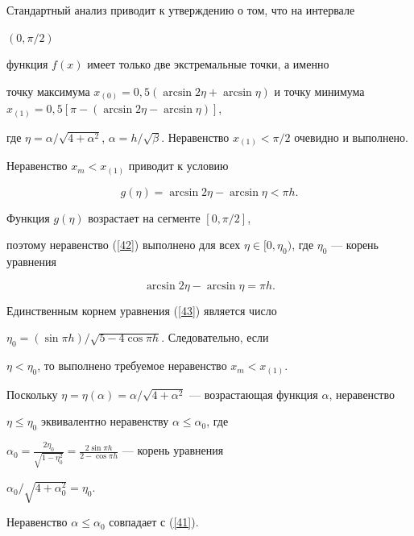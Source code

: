 \begin{pf}


Стандартный анализ приводит к утверждению о том, что на интервале 


$({0,\pi/2})$


функция $f(x)$ имеет только две экстремальные точки, а именно


точку максимума $ x_{(0)}=0{,}5({\arcsin 2\eta+\arcsin


\eta}) $ и точку минимума $ x_{(1)}=0{,}5[ {\pi -


({\arcsin 2\eta-\arcsin \eta})}]$,


где $\eta=\alpha /\sqrt {4+\alpha ^2}$, $ \alpha=h/\sqrt


{\beta}$. Неравенство $x_{(1)} < \pi /2$ очевидно и выполнено.


Неравенство $x_m < x_{(1)} $ приводит к условию


\begin{equation}\label{42}


g(\eta)=\arcsin 2\eta-\arcsin \eta < \pi h.


\end{equation}


Функция $g(\eta) $ возрастает на сегменте $[ {0,\pi /2}]$, 


поэтому неравенство (\ref{42}) выполнено для всех $\eta


\in [ {0,\eta_0})$, где ${\eta_0}$ --- корень уравнения


\begin{equation}\label{43}


\arcsin 2\eta-\arcsin \eta=\pi h.


\end{equation}


Единственным корнем уравнения (\ref{43}) является число


$ \eta_0=(\sin \pi h)/\sqrt {5-4\cos \pi h}$. Следовательно, если


$\eta < \eta_0$, то выполнено требуемое неравенство $x_m<x_{(1)}$. 


Поскольку $\eta=\eta (\alpha)=\alpha /\sqrt {4+


\alpha ^2} $ --- возрастающая функция $\alpha $, неравенство


$\eta \leqslant \eta_0$ эквивалентно неравенству $\alpha


\leqslant \alpha_0$, где


$\alpha_0=\frac{{2\eta_0}} {{\sqrt {1-\eta_0^2}}}=


\frac{{2\sin \pi h}} {{2-\cos \pi h}}$ --- корень уравнения


$\alpha_0 /\sqrt {4+\alpha_0 ^2}=\eta_0 $.


Неравенство $\alpha \leqslant \alpha_0 $ совпадает с (\ref{41}).


\end{pf}





